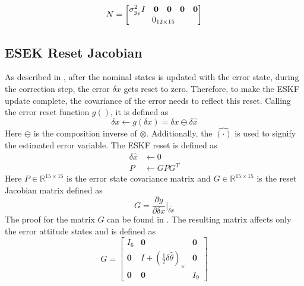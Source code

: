 \begin{equation}
   N =  \begin{bmatrix}
        \sigma^2_{y_p} I & \mathbf{0} & \mathbf{0} & \mathbf{0} & \mathbf{0} \\
        \multicolumn{5}{c}{0_{12 \times 15}}
        \end{bmatrix}
    \label{eq: N quaternion}
\end{equation}

\subsection{ESEK Reset Jacobian}
As described in \cite{Quaternion_Kinematics_for_the_Error-state_EKF}, after the nominal states is updated with the error state, during the correction step, the error $\delta x$ gets reset to zero. Therefore, to make the ESKF update complete, the covariance of the error needs to reflect this reset. Calling the error reset function $g()$, it is defined as \cite{Quaternion_Kinematics_for_the_Error-state_EKF}
\begin{equation}
    \delta x \leftarrow g(\delta x) = \delta x \ominus \delta \hat{x}
    \label{eq: g() reset fnc}
\end{equation}
Here $\ominus$ is the composition inverse of $\otimes$. Additionally, the $\hat{(\cdot)}$ is used to signify the estimated error variable. The ESKF reset is defined as \cite{Quaternion_Kinematics_for_the_Error-state_EKF}
\begin{subequations}
    \begin{align}
        \delta \hat{x} &\leftarrow 0\\
        P &\leftarrow G P G^T
        \label{eq: error reset operation}
    \end{align}
\end{subequations}
Here $P \in \mathbb{R}^{15 \times 15}$ is the error state covariance matrix and $G \in \mathbb{R}^{15 \times 15}$ is the reset Jacobian matrix defined as
\begin{equation}
    G = \frac{\partial g}{\partial \delta x}\bigg|_{\bar{\delta x}}
    \label{eq: G partial}
\end{equation}
The proof for the matrix $G$ can be found in \cite{Quaternion_Kinematics_for_the_Error-state_EKF}. The resulting matrix affects only the error attitude states and is defined as
\begin{equation}
    G = \begin{bmatrix}
        I_6 & \mathbf{0} & \mathbf{0}\\
        \mathbf{0} & I + (\frac{1}{2} \delta \hat{\theta})_{\times} & \mathbf{0}\\
        \mathbf{0} & \mathbf{0} & I_9
    \end{bmatrix}
    \label{eq: Full G matrix}
\end{equation}


